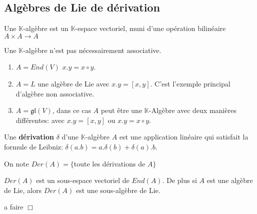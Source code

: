 \documentclass[a4paper,openany,12pt]{report}
\newcommand{\KK}{\mathbb{K}}
\newcommand{\gl}{\mathfrak{gl}}
\theoremstyle{break}
{\theorembodyfont{\upshape}
\newtheorem*{rmq}{Remarque :}
\newtheorem*{prv}{Preuve :}
\newtheorem*{ex}{Exemples :}
\newtheorem{exe}{Exemple : }
\newtheorem*{nota}{Notation :}}
\begin{document}
\subsection{Algèbres de Lie de  dérivation}
 
\begin{df}
\quad Une $\KK$-algèbre est un $\KK$-espace vectoriel, muni d'une opération bilinéaire $A \times A \to  A$
\end{df}

\begin{rmq}
Une $\KK$-algèbre n'est pas nécessairement associative.
\end{rmq}

\begin{ex}
\begin{enumerate}
\item $A=End(V)$ \quad $x.y=x\circ y$.

\item $A=L$ une algèbre de Lie avec $x. y= [x,y]$. C'est l'exemple principal d'algèbre non associative.

\item $A=\gl(V)$, dans ce cas $A$ peut être une $\KK$-Algèbre avec deux manières différentes: avec $x. y= [x,y]$ ou  $x.y=x\circ y$.
\end{enumerate}
\end{ex}

\begin{df}
\quad Une \textbf{dérivation} $\delta$ d'une $\KK$-algèbre $A$ est une application linéaire qui satisfait la formule de Leibniz:
\center $\delta(a.b)=a.\delta(b)+\delta(a).b$.
\end{df}

\begin{nota}
\quad On note $Der(A)=\{ $toute les dérivations de $A \}$
\end{nota}

\begin{prop}
\quad $Der(A)$ est un sous-espace vectoriel de $End(A)$.
De plus si $A$ est une algèbre de Lie, alors $Der(A)$ est une sous-algèbre de Lie. 
\end{prop}

\begin{prv}
a faire $\Box$
\end{prv}
\end{document}
